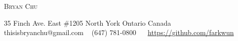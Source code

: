 \documentclass[a4paper, oneside, final]{scrartcl} %
\begin{document}
\setlength{\pdfpagewidth}{8.5in}
\setlength{\pdfpageheight}{11in}

\begin{center} %


  {\fontsize{36}{36}\selectfont\scshape {Bryan Chu}} %

  \vspace{0.3cm} %

  {\renewcommand{\headfont}{\normalfont\rmfamily\scshape} %
    \fontsize{12.5}{17}\selectfont\scshape %

    35 Finch Ave. East $\#$1205 {\large\textperiodcentered} North York {\large\textperiodcentered} Ontario {\large\textperiodcentered} Canada\\ %
    {\Large\Letter} thisisbryanchu@gmail.com \ {\Large\Telefon} (647) 781-0800 \ %
    \faGithub \ \href{https://github.com/farkwun}{https://github.com/farkwun}
  }

%



\end{center}
\end{document}
